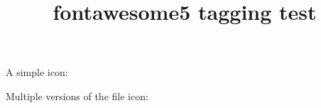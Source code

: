 \documentclass{article}
\title{fontawesome5 tagging test}
\begin{document}
A simple icon: \faHandPointUp

Multiple versions of the file icon:

\faFile

\faFile*

\faFile[regular]

\faFile*[regular]
\end{document}
